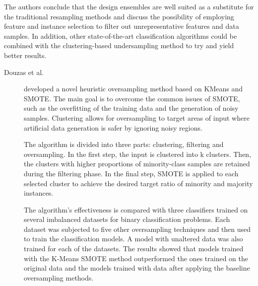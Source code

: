 \begin{description}
    The authors conclude that the design ensembles are well suited as a substitute for the traditional resampling methods and discuss the possibility of employing feature and instance selection to filter out unrepresentative features and data samples. In addition, other state-of-the-art classification algorithms could be combined with the clustering-based undersampling method to try and yield better results.
\end{description}


\begin{description}
    \item[Douzas et al.]\cite{Douzas.Bacao.ea_Improvingimbalancedlearning_2018} developed a novel heuristic oversampling method based on KMeans and SMOTE. The main goal is to overcome the common issues of SMOTE, such as the overfitting of the training data and the generation of noisy samples. Clustering allows for oversampling to target areas of input where artificial data generation is safer by ignoring noisy regions. 
    
    The algorithm is divided into three parts: clustering, filtering and oversampling. In the first step, the input is clustered into k clusters. Then, the clusters with higher proportions of minority-class samples are retained during the filtering phase. In the final step, SMOTE is applied to each selected cluster to achieve the desired target ratio of minority and majority instances. 

    The algorithm's effectiveness is compared with three classifiers trained on several imbalanced datasets for binary classification problems. Each dataset was subjected to five other oversampling techniques and then used to train the classification models. A model with unaltered data was also trained for each of the datasets. The results showed that models trained with the K-Means SMOTE method outperformed the ones trained on the original data and the models trained with data after applying the baseline oversampling methods.
\end{description}


